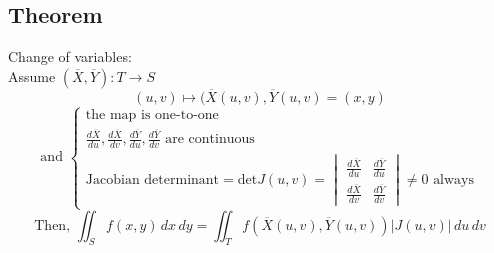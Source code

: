 \documentclass[12pt]{article}
\begin{document}
    \subsection*{Theorem}
        Change of variables: \\
        Assume $(\overline{X},\overline{Y}):T\rightarrow S$ \\
        \[ (u,v)\mapsto(\overline{X}(u,v),\overline{Y}(u,v)=(x,y) \]
        \[
            \text{and }
            \begin{cases}
                \text{the map is one-to-one} \\
                \frac{d\overline{X}}{du},\frac{d\overline{X}}{dv},\frac{d\overline{Y}}{du},\frac{d\overline{Y}}{dv}\text{ are continuous} \\
                \text{Jacobian determinant}=\text{det}J(u,v)=\begin{vmatrix*}
                    \frac{d\overline{X}}{du} & \frac{d\overline{Y}}{du} \\
                    \frac{d\overline{X}}{dv} & \frac{d\overline{Y}}{dv}
                \end{vmatrix*}
                \neq 0 \text{ always}
            \end{cases}
        \]
        \[ \text{Then, } \iint_Sf(x,y)\,dx\,dy=\iint_Tf(\overline{X}(u,v),\overline{Y}(u,v))|J(u,v)|\,du\,dv \]
\end{document}
